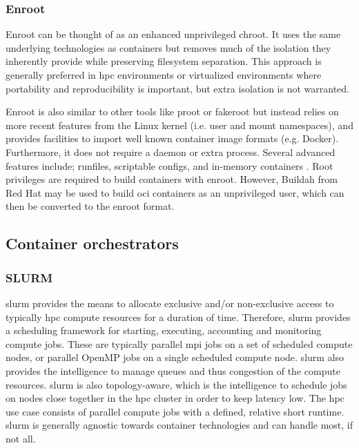 \documentclass[12pt]{article}
\begin{document}
\subsubsection{Enroot}
Enroot can be thought of as an enhanced unprivileged chroot. It uses the same underlying technologies as containers but removes much of the isolation they inherently provide while preserving filesystem separation. This approach is generally preferred in \gls{hpc} environments or virtualized environments where portability and reproducibility is important, but extra isolation is not warranted.

Enroot is also similar to other tools like proot or fakeroot but instead relies on more recent features from the Linux kernel (i.e. user and mount namespaces), and provides facilities to import well known container image formats (e.g. Docker). Furthermore, it does not require a daemon or extra process. Several advanced features include; runfiles, scriptable configs, and in-memory containers \cite{nvidia-slurm-containers}. Root privileges are required to build containers with enroot. However, Buildah from Red Hat may be used to build \gls{oci} containers as an unprivileged user, which can then be converted to the enroot format.


\subsection{Container orchestrators}
\subsubsection{SLURM}
\gls{slurm} provides the means to allocate exclusive and/or non-exclusive access to typically \gls{hpc} compute resources for a duration of time. Therefore, \gls{slurm} provides a scheduling framework for starting, executing, accounting and monitoring compute jobs. These are typically parallel \gls{mpi} jobs on a set of scheduled compute nodes, or parallel OpenMP jobs on a single scheduled compute node. \gls{slurm} also provides the intelligence to manage queues and thus congestion of the compute resources. \gls{slurm} is also topology-aware, which is the intelligence to schedule jobs on nodes close together in the \gls{hpc} cluster in order to keep latency low. The \gls{hpc} use case consists of parallel compute jobs with a defined, relative short runtime. \gls{slurm} is generally agnostic towards container technologies and can handle most, if not all.
\end{document}
